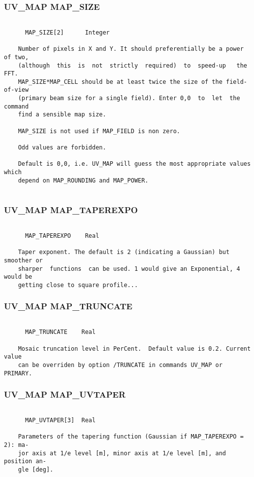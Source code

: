 \subsubsection{UV\_MAP MAP\_SIZE}
\begin{verbatim}

      MAP_SIZE[2]      Integer

    Number of pixels in X and Y. It should preferentially be a power of two,
    (although  this  is  not  strictly  required)  to  speed-up   the   FFT.
    MAP_SIZE*MAP_CELL should be at least twice the size of the field-of-view
    (primary beam size for a single field). Enter 0,0  to  let  the  command
    find a sensible map size.

    MAP_SIZE is not used if MAP_FIELD is non zero.

    Odd values are forbidden.

    Default is 0,0, i.e. UV_MAP will guess the most appropriate values which
    depend on MAP_ROUNDING and MAP_POWER.


\end{verbatim}
\subsubsection{UV\_MAP MAP\_TAPEREXPO}
\begin{verbatim}

      MAP_TAPEREXPO    Real

    Taper exponent. The default is 2 (indicating a Gaussian) but smoother or
    sharper  functions  can be used. 1 would give an Exponential, 4 would be
    getting close to square profile...

\end{verbatim}
\subsubsection{UV\_MAP MAP\_TRUNCATE}
\begin{verbatim}

      MAP_TRUNCATE    Real

    Mosaic truncation level in PerCent.  Default value is 0.2. Current value
    can be overriden by option /TRUNCATE in commands UV_MAP or PRIMARY.

\end{verbatim}
\subsubsection{UV\_MAP MAP\_UVTAPER}
\begin{verbatim}

      MAP_UVTAPER[3]  Real

    Parameters of the tapering function (Gaussian if MAP_TAPEREXPO = 2): ma-
    jor axis at 1/e level [m], minor axis at 1/e level [m], and position an-
    gle [deg].

\end{verbatim}
